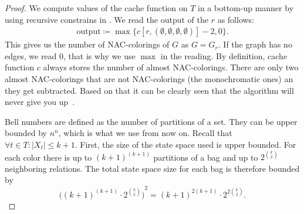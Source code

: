 %
%
\begin{proof}
	We compute values of the cache function on \( T \) in a bottom-up manner
	by using recursive constrains in
	.
	We read the output of the \RootNode{} \( r \) as follows:
	\begin{align*}
		\text{output} \coloneqq \max\{c[r, (\emptyset,\emptyset,\emptyset,\emptyset)] - 2, 0\}.
	\end{align*}
	This gives us the number of NAC-colorings of \( G \) as \( G = G_r \).
	If the graph has no edges, we read \( 0 \), that is why we use \( \max{} \) in the reading.
	By definition, cache function \( c \) always stores the number of almost NAC-colorings.
	There are only two almost NAC-colorings
	that are not NAC-colorings (the monochromatic ones) an they get subtracted.
	Based on that it can be clearly seen that the algorithm
	will never give you up~\cite{never_gonna_give_you_up}.

	Bell numbers are defined as the number of partitions of a set.
	They can be upper bounded by \( n^n \), which is what we use from now on.
	Recall that \( \forall t \in T : |X_t| \le k+1 \).
	First, the size of the state space used is upper bounded.
	For each color there is up to \( {(k+1)}^{(k+1)} \) partitions of a bag and
	up to \( 2^{\binom{k}{2}} \) neighboring relations.
	The total state space size for each bag is therefore bounded by
	\[ {\Big({(k+1)}^{(k+1)} \cdot 2^{\binom{k}{2}} \Big)}^2 = {(k+1)}^{2(k+1)} \cdot 2^{2 \binom{k}{2}}. \]


\end{proof}
